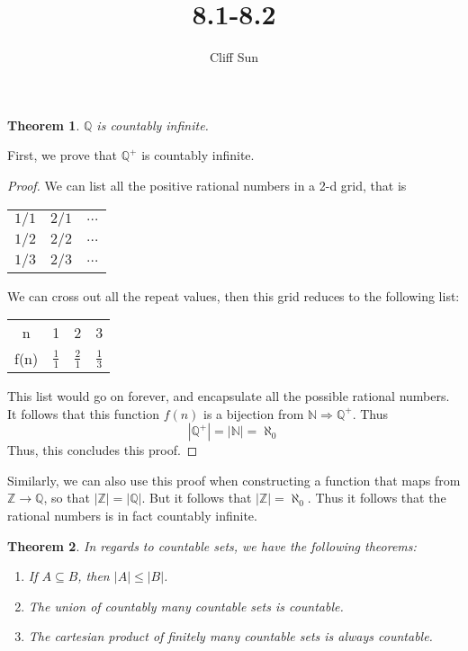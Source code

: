\documentclass{article}
\title{8.1-8.2}
\author{Cliff Sun}
\newtheorem{theorem}{Theorem}[section]
\begin{document}
\maketitle

\begin{theorem}
    $\mathbb{Q}$ is countably infinite. 
\end{theorem}

First, we prove that $\mathbb{Q}^+$ is countably infinite.

\begin{proof}
    We can list all the positive rational numbers in a 2-d grid, that is

    \begin{center}
        \begin{tabular}{c c c}
            $1/1$ & $2/1$ & $\dots$ \\
            $1/2$ & $2/2$ & $\dots$ \\
            $1/3$ & $2/3$ & $\dots$
         \end{tabular}
    \end{center}

     We can cross out all the repeat values, then this grid reduces to the following list:

     \begin{center}
        \begin{tabular}{ |c|c|c|c| } 
            n & 1 & 2 & 3\\
            f(n) & $\frac{1}{1}$ & $\frac{2}{1}$ & $\frac{1}{3}$
        \end{tabular}
     \end{center}
     This list would go on forever, and encapsulate all the possible rational numbers. It follows that this function $f(n)$ is a bijection from $\mathbb{N} \Rightarrow \mathbb{Q}^+$. Thus 
     \begin{equation}
        |\mathbb{Q}^+| = |\mathbb{N}| = \aleph_0
     \end{equation}
     Thus, this concludes this proof. 
\end{proof}

Similarly, we can also use this proof when constructing a function that maps from $\mathbb{Z} \rightarrow \mathbb{Q}$, so that $|\mathbb{Z}| = |\mathbb{Q}|$. But it follows that $|\mathbb{Z}| = \aleph_0$. Thus it follows that the rational numbers is in fact countably infinite. 

\begin{theorem}
    In regards to countable sets, we have the following theorems:
    \begin{enumerate}
        \item If $A \subseteq B$, then $|A| \leq |B|$.
        \item The union of countably many countable sets is countable.
        \item The cartesian product of finitely many countable sets is always countable.
    \end{enumerate}
\end{theorem}
\end{document}
